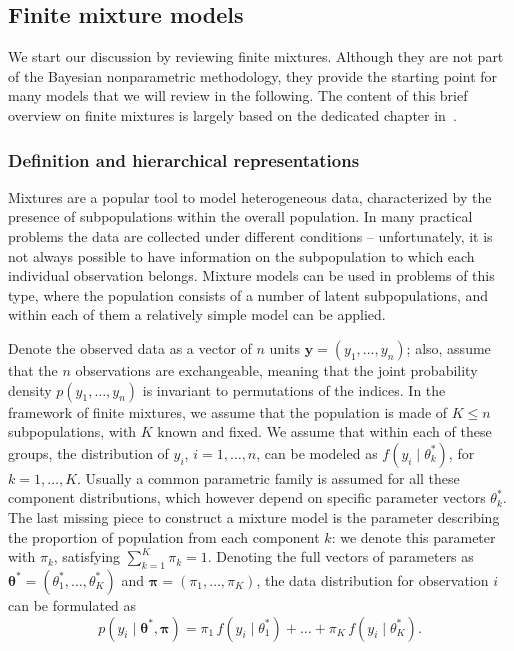 \subsection{Finite mixture models}
\label{ch1_sec:finite_mix}
We start our discussion by reviewing finite mixtures. Although they are not part of the Bayesian nonparametric methodology, they provide the starting point for many models that we will review in the following. The content of this brief overview on finite mixtures is largely based on the dedicated chapter in~\citet{gelman2013}.

\subsubsection*{Definition and hierarchical representations}
Mixtures are a popular tool to model heterogeneous data, characterized by the presence of subpopulations within the overall population. In many practical problems the data are collected under different conditions -- unfortunately, it is not always possible to have information on the subpopulation to which each individual observation belongs.
Mixture models can be used in problems of this type, where the population consists of a number of latent subpopulations, and within each of them a relatively simple model can be applied.

Denote the observed data as a vector of $n$ units $\bm{y} = (y_1,\dots,y_n)$; also, assume that the $n$ observations are exchangeable, meaning that the joint probability density $p(y_1,\dots,y_n)$ is invariant to permutations of the indices. In the framework of finite mixtures, we assume that the population is made of $K\leq n$ subpopulations, with $K$ known and fixed.
We assume that within each of these groups, the distribution of $y_i$, $i=1,\dots,n$, can be modeled as $f(y_i \mid \theta_k^*)$, for $k=1,\dots,K$. Usually a common parametric family is assumed for all these component distributions, which however depend on specific parameter vectors $\theta_k^*$.
The last missing piece to construct a mixture model is the parameter describing the proportion of population from each component $k$: we denote this parameter with $\pi_k$, satisfying $\sum_{k=1}^K \pi_k = 1$. Denoting the full vectors of parameters as $\bm{\theta}^* = (\theta_1^*,\dots,\theta_K^*)$ and $\bm{\pi} = (\pi_1,\dots,\pi_K)$, the data distribution for observation $i$ can be formulated as
\begin{equation*}
p(y_i\mid \bm{\theta}^*,\bm{\pi}) = \pi_1 \, f(y_i\mid\theta_1^*) + \dots + \pi_K \, f(y_i\mid\theta_K^*).
\end{equation*}

